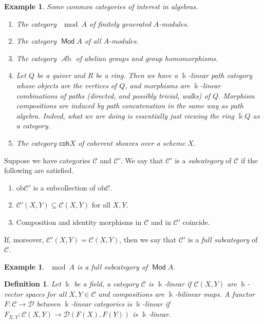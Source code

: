 \documentclass[11pt,a4paper]{article}
\numberwithin{equation}{section}
\theoremstyle{all}
\newtheorem{example}[theorem]{Example}
\newtheorem{definition}[theorem]{Definition}
\theoremstyle{remark}
\newcommand{\CC}{\mathcal{C}}
\newcommand{\CD}{\mathcal{D}}
\DeclareMathOperator{\Mod}{\mathsf{Mod}}
\newcommand{\Ab}{\operatorname{\mathcal{A}b}}
\newcommand{\defn}[1]{\textsl{\color{darkblue} #1}}
\begin{document}
\begin{example}
Some common categories of interest in algebras.
\begin{enumerate}
\item The category $\mod A$ of \emph{finitely generated} $A$-modules.

\item The category $\Mod A$ of \emph{all} $A$-modules.

\item The category $\Ab$ of abelian groups and group homomorphisms.

\item Let $Q$ be a quiver and $R$ be a ring.  Then we have a \defn{$\Bbbk$-linear path category} whose objects are the vertices of $Q$, and morphisms are $\Bbbk$-linear combinations of paths (directed, and possibly trivial, walks) of $Q$.  Morphism compositions are induced by path concatenation in the same way as path algebra.  Indeed, what we are doing is essentially just viewing the ring $\Bbbk Q$ as a category.

\item The category $\mathsf{coh} X$ of coherent sheaves over a scheme $X$.
\end{enumerate}
\end{example}

Suppose we have categories $\CC$ and $\CC'$.
We say that $\CC'$ is a \defn{subcategory} of $\CC$ if the following are satisfied.
\begin{enumerate}
\item $\mathrm{ob}\CC'$ is a subcollection of $\mathrm{ob}\CC$.
\item $\CC'(X,Y)\subseteq \CC(X,Y)$ for all $X,Y$.
\item Composition and identity morphisms in $\CC$ and in $\CC'$ coincide.
\end{enumerate}
If, moreover, $\CC'(X,Y)=\CC(X,Y)$, then we say that $\CC'$ is a \defn{full subcategory} of $\CC$.

\begin{example}
$\mod A$ is a full subcategory of $\Mod A$.
\end{example}

\begin{definition}
Let $\Bbbk$ be a field, a category $\CC$ is \defn{$\Bbbk$-linear} if $\CC(X,Y)$ are $\Bbbk$-vector spaces for all $X,Y\in\CC$ and compositions are $\Bbbk$-bilinear maps.  A functor $F:\CC\to\CD$ between $\Bbbk$-linear categories is \defn{$\Bbbk$-linear} if $F_{X,Y}:\CC(X,Y)\to \CD(F(X),F(Y))$ is $\Bbbk$-linear.
\end{definition}
\end{document}
